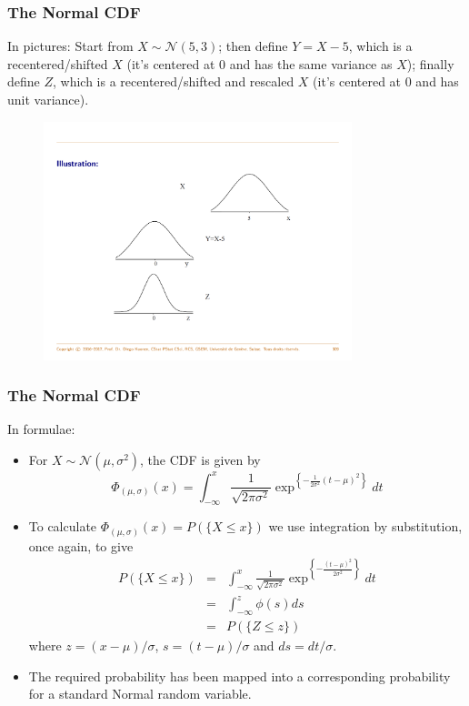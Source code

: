 \documentclass[notes=show,smaller,handout]{beamer}
\renewcommand{\Pr}{P}
\newcommand{\N}{\mathcal{N}}
\newenvironment{stepitemize}{\begin{itemize}[<+->]}{\end{itemize} }
\begin{document}
\begin{frame}%

\frametitle{The Normal CDF}
In pictures:
Start from $X \sim \mathcal{N}(5,3)$; then define $Y=X-5$, which is a recentered/shifted $X$ (it's centered at 0 and has the same variance as $X$); finally define $Z$, which is a recentered/shifted and rescaled $X$ (it's centered at 0 and has unit variance). 

\begin{figure}[ptb]\centering
\includegraphics[width=0.8\textwidth,height=0.65\textheight]{Std_Diego.pdf}%
\end{figure}%



\end{frame}

\begin{frame}%

\frametitle{The Normal CDF}
In formulae:
\begin{stepitemize}
\item For $X\sim \N\left( \mu ,\sigma ^{2}\right) $, the CDF is given by%
$$
\Phi_{(\mu,\sigma)}\left( x\right) =\int_{-\infty }^{x}\frac{1}{\sqrt{2\pi \sigma ^{2}}}\exp^{ \left\{ -\frac{1}{2\sigma ^{2}}\left( t-\mu \right) ^{2}\right\}} dt
$$
\item To calculate $\Phi_{(\mu,\sigma)}\left( x\right)=\Pr(\{X\leq x\})$ we use integration by substitution, once again, to give
\begin{eqnarray*}
\Pr(\{ X\leq x\} )&=&\int_{-\infty}^x\frac{1}{\sqrt{2\pi\sigma^2}}\exp^{\left\{-\frac{(t-\mu)^2}{2\sigma^2}\right\}}dt\\
 &=&\int_{-\infty}^z\phi(s)ds\\
  &=&P(\{Z\leq z\})
\end{eqnarray*}
where $z=(x-\mu)/\sigma$, $s=(t-\mu)/\sigma$ and $ds=dt/\sigma$.
\item The required probability has been mapped into a corresponding probability for a standard Normal random variable.
\end{stepitemize}

\end{frame}%
\end{document}

